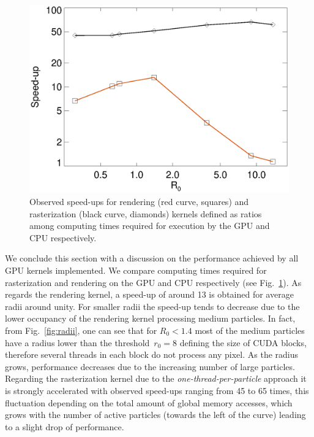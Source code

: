 \documentclass[smallextended]{svjour3}
\begin{document}
\begin{figure}
\includegraphics[scale=0.5]{speedup.eps}
\caption{
Observed speed-ups for rendering (red curve, squares) and rasterization (black curve, diamonds) kernels defined as ratios among computing times required for execution by the GPU and CPU respectively.
}
\label{fig:speedup}
\end{figure}


We conclude this section with a discussion on the performance achieved by all GPU kernels implemented. 
We compare computing times required for rasterization and rendering on the 
GPU and CPU respectively (see Fig.~\ref{fig:speedup}). 
As regards the rendering kernel, a speed-up of around 13 is obtained for average radii around unity. For smaller radii the speed-up
tends to decrease due to the lower occupancy of the rendering kernel processing medium particles.
In fact, from Fig.~\ref{fig:radii}, one can see that for $R_0<1.4$ most of the medium particles have a radius lower than the threshold~$r_0=8$ defining the size of CUDA blocks, therefore several threads in each block do not process any pixel.
As the radius grows, performance decreases due to the increasing number of large particles.
Regarding the rasterization kernel due to the {\it one-thread-per-particle} approach it is strongly accelerated with observed speed-ups ranging from 45 to 65 times, this fluctuation depending on the total amount of global memory accesses, which grows with the number of active particles (towards the left of the curve) leading to a slight drop of performance. 
\end{document}
